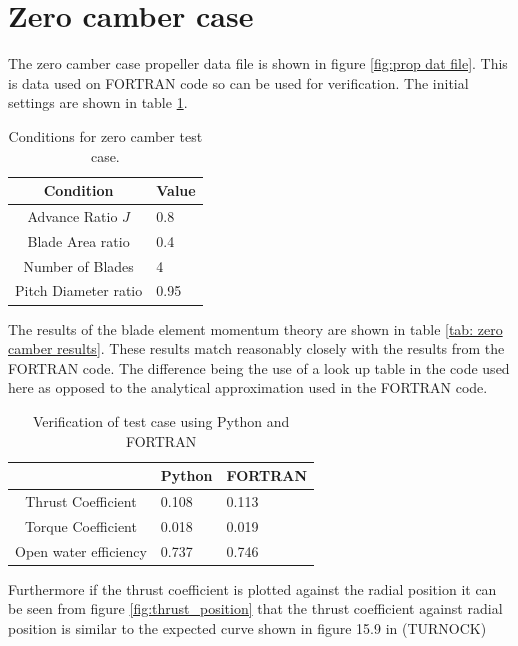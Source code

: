 \documentclass[]{report}
\begin{document}
\section{Zero camber case}

The zero camber case propeller data file is shown in figure \ref{fig:prop dat file}. This is data used on FORTRAN code so can be used for verification. The initial settings are shown in table \ref{tab:zero camber test case}.

\begin{table}[htb]
	
	\label{tab:zero camber test case}
	\centering
	\begin{tabular}{c|l}
		Condition & Value  \\ 	
		\hline
		Advance Ratio $J$ & 0.8 \\
		Blade Area ratio & 0.4 \\
		Number of Blades & 4 \\
		Pitch Diameter ratio & 0.95 \\
	\end{tabular}
\caption{Conditions for zero camber test case.}
\end{table}

The results of the blade element momentum theory are shown in table \ref{tab: zero camber results}. These results match reasonably closely with the results from the FORTRAN code. The difference being the use of a look up table in the code used here as opposed to the analytical approximation used in the FORTRAN code.
\begin{table}[htb]
	\label{tab:zero camber results}
	\centering
	\begin{tabular}{c|l|l}
		 & Python & FORTRAN \\ 	
		\hline
		Thrust Coefficient  & 0.108 & 0.113 \\
		Torque Coefficient & 0.018 & 0.019 \\
		Open water efficiency & 0.737 & 0.746\\
	\end{tabular}
	\caption{Verification of test case using Python and FORTRAN}
\end{table}

Furthermore if the thrust coefficient is plotted against the radial position it can be seen from figure \ref{fig:thrust_position} that the thrust coefficient against radial position is similar to the expected curve shown in figure 15.9 in (TURNOCK) 
\end{document}

